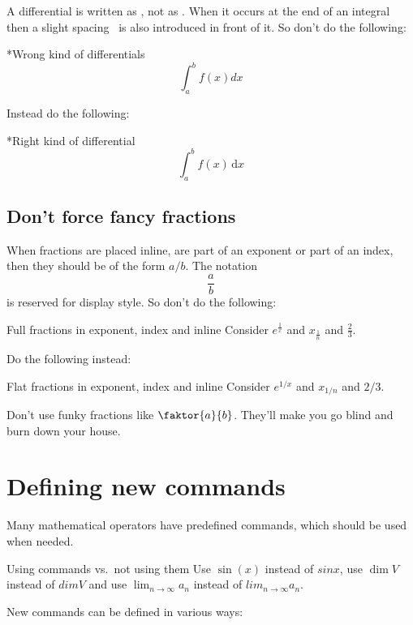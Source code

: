 A differential is written as , not as .
When it occurs at the end of an integral then a slight spacing~\comname{,} is also introduced in front of it.
So don’t do the following:
\begin{showlatex}*{Wrong kind of differentials}
\[
  \int_a^b f(x) dx
\]
\end{showlatex}
Instead do the following:
\begin{showlatex}*{Right kind of differential}
\[
  \int_a^b f(x) \,\mathrm{d}x
\]
\end{showlatex}



\subsection{Don’t force fancy fractions}

When fractions are placed inline, are part of an exponent or part of an index, then they should be of the form $a/b$.
The notation
\[
  \frac{a}{b}
\]
is reserved for display style.
So don’t do the following:
\begin{showlatex}{Full fractions in exponent, index and inline}
Consider $e^{\frac{1}{x}}$ and $x_{\frac{1}{n}}$ and $\frac{2}{3}$.
\end{showlatex}
Do the following instead:
\begin{showlatex}{Flat fractions in exponent, index and inline}
Consider $e^{1/x}$ and $x_{1/n}$ and $2/3$.
\end{showlatex}

Don’t use funky fractions like $\faktor{a}{b}$. They’ll make you go blind and burn down your house.







\section{Defining new commands}

Many mathematical operators have predefined commands, which should be used when needed.
\begin{showlatex}{Using commands vs.\ not using them}
Use $\sin(x)$ instead of $sin x$, use $\dim V$ instead of $dim V$ and use $\lim_{n \to \infty} a_n$ instead of $lim_{n \to \infty} a_n$.
\end{showlatex}
New commands can be defined in various ways:


